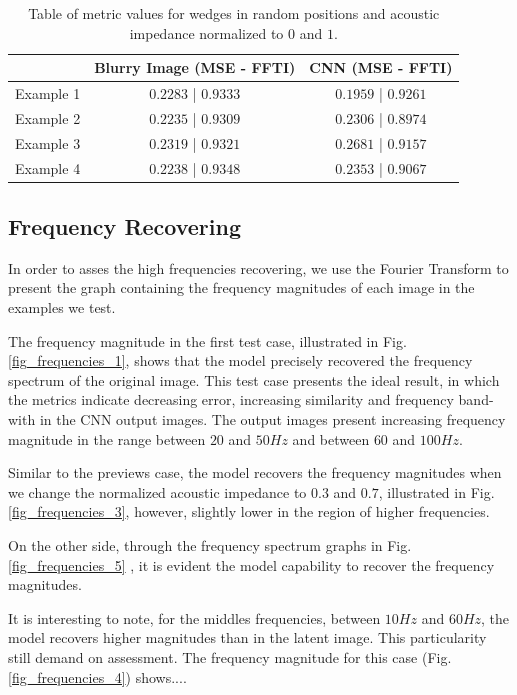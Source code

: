 \documentclass[conference]{IEEEtran}
\begin{document}
\begin{table}[!t]
\renewcommand{\arraystretch}{1.2}
\caption{Table of metric values for wedges in random positions and acoustic impedance normalized to $0$ and $1$.}
\label{table_caso_6}
\centering
\begin{tabular}{|c||c||c|}
\hline
  & Blurry Image (MSE - FFTI) & CNN (MSE - FFTI)\\
\hline
Example 1 & $0.2283$ | $0.9333$ & $0.1959$ | $0.9261$\\
\hline
Example 2 & $0.2235$ | $0.9309$ & $0.2306$ | $0.8974$\\
\hline
Example 3 & $0.2319$ | $0.9321$ & $0.2681$ | $0.9157$\\
\hline
Example 4 & $0.2238$ | $0.9348$ & $0.2353$ | $0.9067$\\
\hline
\end{tabular}
\end{table}

\subsection{Frequency Recovering}
In order to asses the high frequencies recovering, we use the Fourier Transform
to present the graph containing the frequency magnitudes of each image in the
examples we test.

The frequency magnitude in the first test case, illustrated in Fig. \ref{fig_frequencies_1},
shows that the model precisely recovered the frequency spectrum of the original image.
This test case presents the ideal result, in which the metrics indicate 
decreasing error, increasing similarity and frequency band-with in the CNN output images.
The output images present increasing frequency magnitude in the range between $ 20 $ and $ 50 Hz $ and between $ 60 $ and $ 100 Hz $.

Similar to the previews case, the model recovers the frequency magnitudes when we change the normalized
acoustic impedance to $0.3$ and $0.7$, illustrated in Fig. \ref{fig_frequencies_3}, however, slightly lower in the region of higher frequencies. 

On the other side, through the frequency spectrum graphs in Fig. \ref{fig_frequencies_5} , it is evident the model capability to recover the frequency magnitudes.

It is interesting to note, for the middles frequencies, between $10Hz$ and $60Hz$, the model recovers higher magnitudes than in the latent
image. This particularity still demand on assessment.
The frequency magnitude for this case (Fig. \ref{fig_frequencies_4}) shows....
\end{document}
